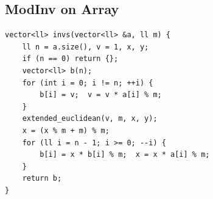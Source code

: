 \documentclass[a4paper,11pt,oneside]{article}
\begin{document}
\begin{multicols*}{\COLS}
\subsection{ModInv on Array}
\begin{lstlisting}
vector<ll> invs(vector<ll> &a, ll m) {
    ll n = a.size(), v = 1, x, y;
    if (n == 0) return {};
    vector<ll> b(n);
    for (int i = 0; i != n; ++i) {
        b[i] = v;  v = v * a[i] % m;
    }
    extended_euclidean(v, m, x, y);
    x = (x % m + m) % m;
    for (ll i = n - 1; i >= 0; --i) {
        b[i] = x * b[i] % m;  x = x * a[i] % m;
    }
    return b;
}
\end{lstlisting}

\end{multicols*}
\end{document}
